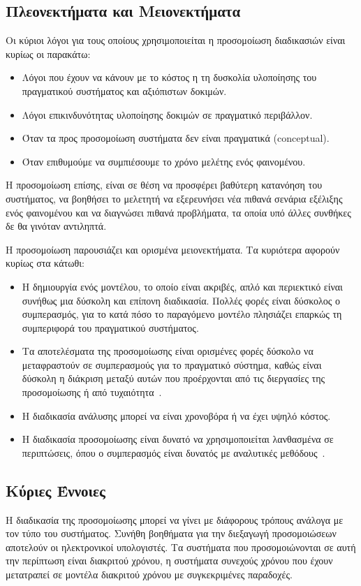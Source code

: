 \documentclass[12pt]{report}
\begin{document}
\subsection{Πλεονεκτήματα και Μειονεκτήματα}
Οι κύριοι λόγοι για τους οποίους χρησιμοποιείται η προσομοίωση διαδικασιών είναι κυρίως οι παρακάτω:

\begin{itemize}
  \item Λόγοι που έχουν να κάνουν με το κόστος η τη δυσκολία υλοποίησης του πραγματικού συστήματος και αξιόπιστων δοκιμών.
  \item Λόγοι επικινδυνότητας υλοποίησης δοκιμών σε πραγματικό περιβάλλον.
  \item Όταν τα προς προσομοίωση συστήματα δεν είναι πραγματικά (\textlatin{conceptual}).
  \item Όταν επιθυμούμε να συμπιέσουμε το χρόνο μελέτης ενός φαινομένου.
\end{itemize}

Η προσομοίωση επίσης, είναι σε θέση να προσφέρει βαθύτερη κατανόηση του συστήματος, να βοηθήσει το μελετητή να εξερευνήσει νέα πιθανά σενάρια εξέλιξης ενός φαινομένου και να διαγνώσει πιθανά προβλήματα, τα οποία υπό άλλες συνθήκες δε θα γινόταν αντιληπτά.

Η προσομοίωση παρουσιάζει και ορισμένα μειονεκτήματα. Τα κυριότερα αφορούν κυρίως στα κάτωθι:

\begin{itemize}
  \item Η δημιουργία ενός μοντέλου, το οποίο είναι ακριβές, απλό και περιεκτικό είναι συνήθως μια δύσκολη και επίπονη διαδικασία. Πολλές φορές είναι δύσκολος ο συμπερασμός, για το κατά πόσο το παραγόμενο μοντέλο πλησιάζει επαρκώς τη συμπεριφορά του πραγματικού συστήματος.
  \item Τα αποτελέσματα της προσομοίωσης είναι ορισμένες φορές δύσκολο να μεταφραστούν σε συμπερασμούς για το πραγματικό σύστημα, καθώς είναι δύσκολη η διάκριση μεταξύ αυτών που προέρχονται από τις διεργασίες της προσομοίωσης ή από τυχαιότητα~\cite{book:04}.
  \item Η διαδικασία ανάλυσης μπορεί να είναι χρονοβόρα ή να έχει υψηλό κόστος.
  \item Η διαδικασία προσομοίωσης είναι δυνατό να χρησιμοποιείται λανθασμένα σε περιπτώσεις, όπου ο συμπερασμός είναι δυνατός με αναλυτικές μεθόδους~\cite{book:04}.
\end{itemize}

\subsection{Κύριες Έννοιες}
Η διαδικασία της προσομοίωσης μπορεί να γίνει με διάφορους τρόπους ανάλογα με τον τύπο του συστήματος. Συνήθη βοηθήματα για την διεξαγωγή προσομοιώσεων αποτελούν οι ηλεκτρονικοί υπολογιστές. Τα συστήματα που προσομοιώνονται σε αυτή την περίπτωση είναι διακριτού χρόνου, η συστήματα συνεχούς χρόνου που έχουν μετατραπεί σε μοντέλα διακριτού χρόνου με συγκεκριμένες παραδοχές.
\end{document}
